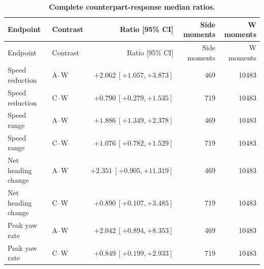 \begingroup\scriptsize
\setlength{\tabcolsep}{4pt}
\renewcommand{\arraystretch}{1.1}
\begin{longtable}{llrrr}
\caption{\textbf{Complete counterpart-response median ratios.}}\label{tab:counterpart_full}\\
\toprule
Endpoint & Contrast & Ratio [95\% CI] & Side moments & W moments \\
\midrule
\endfirsthead
\toprule
Endpoint & Contrast & Ratio [95\% CI] & Side moments & W moments \\
\midrule
\endhead
\bottomrule
\endfoot
Speed reduction & A--W & $+2.062\ [+1.057,+3.873]$ & 469 & 10483 \\
Speed reduction & C--W & $+0.790\ [+0.279,+1.535]$ & 719 & 10483 \\
Speed range & A--W & $+1.886\ [+1.349,+2.378]$ & 469 & 10483 \\
Speed range & C--W & $+1.076\ [+0.782,+1.529]$ & 719 & 10483 \\
Net heading change & A--W & $+2.351\ [+0.905,+11.319]$ & 469 & 10483 \\
Net heading change & C--W & $+0.890\ [+0.107,+3.485]$ & 719 & 10483 \\
Peak yaw rate & A--W & $+2.042\ [+0.894,+8.353]$ & 469 & 10483 \\
Peak yaw rate & C--W & $+0.849\ [+0.199,+2.933]$ & 719 & 10483 \\
\end{longtable}
\endgroup
